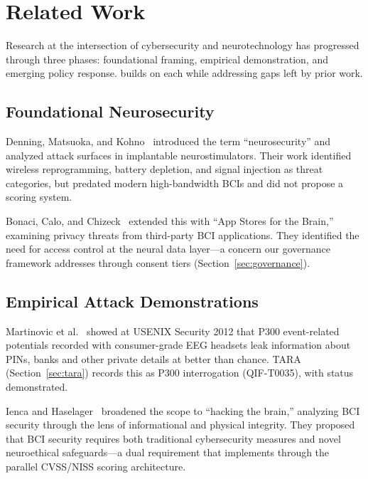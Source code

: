 
\section{Related Work}
\label{sec:related-work}

Research at the intersection of cybersecurity and neurotechnology has progressed
through three phases: foundational framing, empirical demonstration, and emerging
policy response. \qif builds on each while addressing gaps left by prior work.

\subsection{Foundational Neurosecurity}

Denning, Matsuoka, and Kohno~\cite{kohno2009neurosecurity}
introduced the term ``neurosecurity'' and analyzed attack
surfaces in implantable neurostimulators. Their work identified wireless
reprogramming, battery depletion, and signal injection as threat categories, but
predated modern high-bandwidth BCIs and did not propose a scoring system.

Bonaci, Calo, and Chizeck~\cite{bonaci2015appstores} extended this with ``App
Stores for the Brain,'' examining privacy threats from third-party BCI
applications. They identified the need for access control at the neural data
layer---a concern our governance framework addresses through consent tiers
(Section~\ref{sec:governance}).

\subsection{Empirical Attack Demonstrations}

Martinovic et al.~\cite{martinovic2012feasibility} showed at USENIX Security
2012 that P300 event-related potentials recorded with consumer-grade EEG headsets
leak information about PINs, banks and other private details at better than chance.
TARA (Section~\ref{sec:tara}) records this as P300 interrogation (QIF-T0035), with
status demonstrated.

Ienca and Haselager~\cite{ienca2016hacking} broadened the scope to ``hacking the
brain,'' analyzing BCI security through the lens of informational and physical
integrity. They proposed that BCI security requires both traditional cybersecurity
measures and novel neuroethical safeguards---a dual requirement that \qif
implements through the parallel CVSS/NISS scoring architecture.

